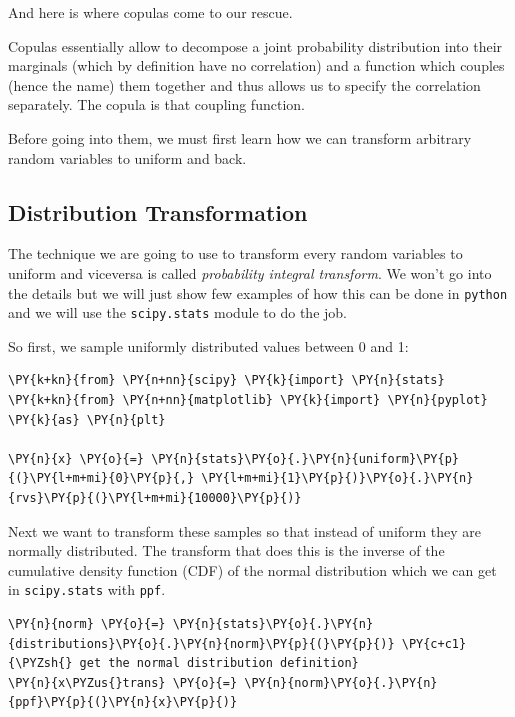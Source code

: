 And here is where copulas come to our rescue.

Copulas essentially allow to decompose a joint probability distribution
into their marginals (which by definition have no correlation) and a
function which couples (hence the name) them together and thus allows us
to specify the correlation separately. The copula is that coupling
function.

Before going into them, we must first learn how we can transform
arbitrary random variables to uniform and back.

\subsection{Distribution
Transformation}\label{distribution-transformation}

The technique we are going to use to transform every random variables to
uniform and viceversa is called \emph{probability integral transform}.
We won't go into the details but we will just show few examples of how
this can be done in \texttt{python} and we will use the
\texttt{scipy.stats} module to do the job.

So first, we sample uniformly distributed values between 0 and 1:

    \begin{tcolorbox}[breakable, size=fbox, boxrule=1pt, pad at break*=1mm,colback=cellbackground, colframe=cellborder]
\begin{Verbatim}[commandchars=\\\{\}]
\PY{k+kn}{from} \PY{n+nn}{scipy} \PY{k}{import} \PY{n}{stats}
\PY{k+kn}{from} \PY{n+nn}{matplotlib} \PY{k}{import} \PY{n}{pyplot} \PY{k}{as} \PY{n}{plt}

\PY{n}{x} \PY{o}{=} \PY{n}{stats}\PY{o}{.}\PY{n}{uniform}\PY{p}{(}\PY{l+m+mi}{0}\PY{p}{,} \PY{l+m+mi}{1}\PY{p}{)}\PY{o}{.}\PY{n}{rvs}\PY{p}{(}\PY{l+m+mi}{10000}\PY{p}{)}
\end{Verbatim}
\end{tcolorbox}

Next we want to transform these samples so that instead of uniform they
are normally distributed. The transform that does this is the inverse of
the cumulative density function (CDF) of the normal distribution which
we can get in \texttt{scipy.stats} with \texttt{ppf}.

\begin{tcolorbox}[breakable, size=fbox, boxrule=1pt, pad at break*=1mm,colback=cellbackground, colframe=cellborder]
\begin{Verbatim}[commandchars=\\\{\}]
\PY{n}{norm} \PY{o}{=} \PY{n}{stats}\PY{o}{.}\PY{n}{distributions}\PY{o}{.}\PY{n}{norm}\PY{p}{(}\PY{p}{)} \PY{c+c1}{\PYZsh{} get the normal distribution definition}
\PY{n}{x\PYZus{}trans} \PY{o}{=} \PY{n}{norm}\PY{o}{.}\PY{n}{ppf}\PY{p}{(}\PY{n}{x}\PY{p}{)}
\end{Verbatim}
\end{tcolorbox}

